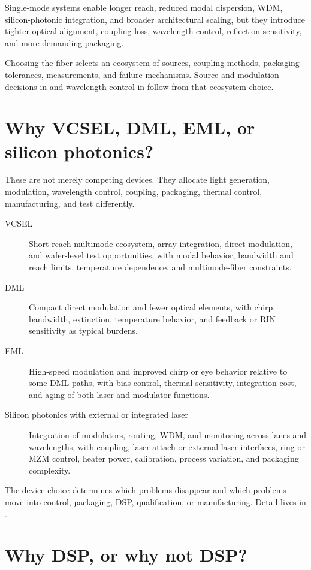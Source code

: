 Single-mode systems enable longer reach, reduced modal dispersion, WDM,
silicon-photonic integration, and broader architectural scaling, but they
introduce tighter optical alignment, coupling loss, wavelength control,
reflection sensitivity, and more demanding packaging.

Choosing the fiber selects an ecosystem of sources, coupling methods, packaging
tolerances, measurements, and failure mechanisms. Source and modulation
decisions in  and wavelength control in  follow from
that ecosystem choice.

\section{Why VCSEL, DML, EML, or silicon photonics?}

These are not merely competing devices. They allocate light generation,
modulation, wavelength control, coupling, packaging, thermal control,
manufacturing, and test differently.

\begin{description}
\item[VCSEL] Short-reach multimode ecosystem, array integration, direct
      modulation, and wafer-level test opportunities, with modal behavior,
      bandwidth and reach limits, temperature dependence, and multimode-fiber
      constraints.
\item[DML] Compact direct modulation and fewer optical elements, with chirp,
      bandwidth, extinction, temperature behavior, and feedback or RIN
      sensitivity as typical burdens.
\item[EML] High-speed modulation and improved chirp or eye behavior relative to
      some DML paths, with bias control, thermal sensitivity, integration cost,
      and aging of both laser and modulator functions.
\item[Silicon photonics with external or integrated laser] Integration of
      modulators, routing, WDM, and monitoring across lanes and wavelengths, with
      coupling, laser attach or external-laser interfaces, ring or MZM control,
      heater power, calibration, process variation, and packaging complexity.
\end{description}

The device choice determines which problems disappear and which problems move
into control, packaging, DSP, qualification, or manufacturing. Detail lives in
.

\section{Why DSP, or why not DSP?}

